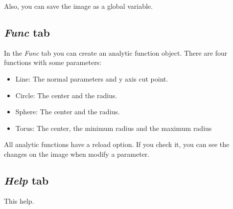 \documentclass{article}
\begin{document}
Also, you can save the image as a global variable.

\subsection{\emph{Func} tab}
In the \emph{Func} tab you can create an analytic function object. There are four functions with some parameters:
\begin{itemize}
	\item Line: The normal parameters and y axis cut point.
	\item Circle: The center and the radius.
	\item Sphere: The center and the radius.
	\item Torus: The center, the minimum radius and the maximum radius
\end{itemize}

All analytic functions have a reload option. If you check it, you can see the changes on the image when modify a parameter.

\subsection{\emph{Help} tab}
This help.
\end{document}

